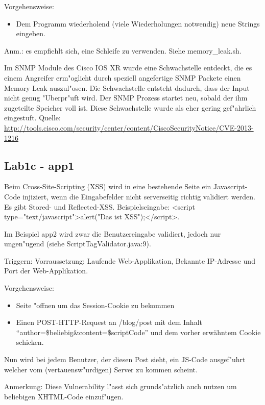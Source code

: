 \documentclass[12pt,a4paper,titlepage,oneside]{scrartcl}
\begin{document}
\begin{description}
Vorgehensweise:
\begin{itemize}
	\item Dem Programm wiederholend (viele Wiederholungen notwendig) neue Strings eingeben.
\end{itemize}
Anm.: es empfiehlt sich, eine Schleife zu verwenden. Siehe memory\_leak.sh.\newline
    
    Im SNMP Module des Cisco IOS XR wurde eine Schwachstelle entdeckt, die es einem Angreifer erm"oglicht durch speziell angefertige SNMP Packete einen Memory Leak auszul"osen. Die Schwachstelle entsteht dadurch, dass der Input nicht genug "Uberpr"uft wird. Der SNMP Prozess startet neu, sobald der ihm zugeteilte Speicher voll ist. Diese Schwachstelle wurde als eher gering gef"ahrlich eingestuft.\newline
    Quelle: \url{http://tools.cisco.com/security/center/content/CiscoSecurityNotice/CVE-2013-1216}
\end{description}

\subsection{Lab1c - app1}
Beim Cross-Site-Scripting (XSS) wird in eine bestehende Seite ein Javascript-Code injiziert, wenn die Eingabefelder nicht serverseitig richtig validiert werden.\newline
Es gibt Stored- und Reflected-XSS.
Beispielseingabe: <script type="text/javascript">alert("Das ist XSS");</script>.

Im Beispiel app2 wird zwar die Benutzereingabe validiert, jedoch nur ungen"ugend (siehe ScriptTagValidator.java:9).

Triggern:
Vorraussetzung: Laufende Web-Applikation, Bekannte IP-Adresse und Port der Web-Applikation.

Vorgehensweise:
\begin{itemize}
	\item Seite "offnen um das Session-Cookie zu bekommen
	\item Einen POST-HTTP-Request an /blog/post mit dem Inhalt ``author=\$beliebig\&content=\$scriptCode'' und dem vorher erwähntem Cookie schicken.
\end{itemize}

Nun wird bei jedem Benutzer, der diesen Post sieht, ein JS-Code ausgef"uhrt welcher vom (vertauensw"urdigen) Server zu kommen scheint.

Anmerkung: Diese Vulnerability l"asst sich grunds"atzlich auch nutzen um beliebigen XHTML-Code einzuf"ugen.
\end{document}
